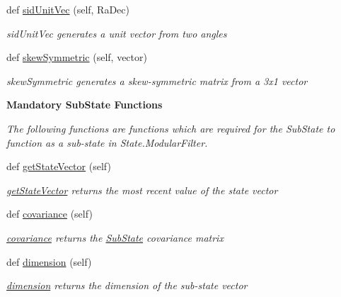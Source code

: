 \begin{DoxyCompactItemize}
def \hyperlink{classmodest_1_1substates_1_1attitude_1_1Attitude_ae6d69671cf2517be4ad69bee7498e665}{sid\+Unit\+Vec} (self, Ra\+Dec)
\begin{DoxyCompactList}\small\item\em sid\+Unit\+Vec generates a unit vector from two angles \end{DoxyCompactList}\item 
def \hyperlink{classmodest_1_1substates_1_1attitude_1_1Attitude_ae6f156a198d9c2328ddffde498c1ca19}{skew\+Symmetric} (self, vector)
\begin{DoxyCompactList}\small\item\em skew\+Symmetric generates a skew-\/symmetric matrix from a 3x1 vector \end{DoxyCompactList}\end{DoxyCompactItemize}
\begin{Indent}{\bf Mandatory Sub\+State Functions}\par
{\em The following functions are functions which are required for the Sub\+State to function as a sub-\/state in State.\+Modular\+Filter. }\begin{DoxyCompactItemize}
\item 
def \hyperlink{classmodest_1_1substates_1_1substate_1_1SubState_aa18c8238415131b4b63cef0e4b2ff9fd}{get\+State\+Vector} (self)
\begin{DoxyCompactList}\small\item\em \hyperlink{classmodest_1_1substates_1_1substate_1_1SubState_aa18c8238415131b4b63cef0e4b2ff9fd}{get\+State\+Vector} returns the most recent value of the state vector \end{DoxyCompactList}\item 
def \hyperlink{classmodest_1_1substates_1_1substate_1_1SubState_a6e308aadd13962e476d2892ec728e3a5}{covariance} (self)
\begin{DoxyCompactList}\small\item\em \hyperlink{classmodest_1_1substates_1_1substate_1_1SubState_a6e308aadd13962e476d2892ec728e3a5}{covariance} returns the \hyperlink{classmodest_1_1substates_1_1substate_1_1SubState}{Sub\+State} covariance matrix \end{DoxyCompactList}\item 
def \hyperlink{classmodest_1_1substates_1_1substate_1_1SubState_ab9027f6d1d7d57c47731612f519b7ee6}{dimension} (self)
\begin{DoxyCompactList}\small\item\em \hyperlink{classmodest_1_1substates_1_1substate_1_1SubState_ab9027f6d1d7d57c47731612f519b7ee6}{dimension} returns the dimension of the sub-\/state vector \end{DoxyCompactList}\end{DoxyCompactItemize}
\end{Indent}
